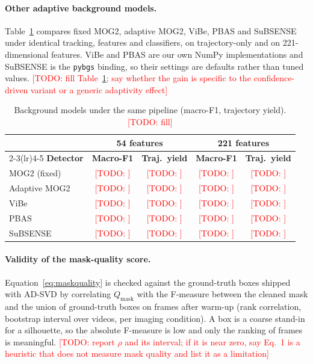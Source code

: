 \documentclass[runningheads]{llncs}
\newcommand{\todo}[1]{\textcolor{red}{[TODO: #1]}}
\begin{document}
\paragraph{Other adaptive background models.}
Table~\ref{tab:detectors} compares fixed MOG2, adaptive MOG2, ViBe, PBAS and SuBSENSE under identical tracking, features and classifiers, on trajectory-only and on 221-dimensional features. ViBe and PBAS are our own NumPy implementations and SuBSENSE is the \texttt{pybgs} binding, so their settings are defaults rather than tuned values. \todo{fill Table~\ref{tab:detectors}; say whether the gain is specific to the confidence-driven variant or a generic adaptivity effect}

\begin{table}[htbp]
\centering
\caption{Background models under the same pipeline (macro-F1, trajectory yield). \todo{fill}}
\label{tab:detectors}
\fontsize{8}{9.6}\selectfont
\begin{tabular}{lcccc}
\toprule
& \multicolumn{2}{c}{\textbf{54 features}} & \multicolumn{2}{c}{\textbf{221 features}} \\
\cmidrule(lr){2-3}\cmidrule(lr){4-5}
\textbf{Detector} & \textbf{Macro-F1} & \textbf{Traj.\ yield} & \textbf{Macro-F1} & \textbf{Traj.\ yield} \\
\midrule
MOG2 (fixed) & \todo{} & \todo{} & \todo{} & \todo{} \\
Adaptive MOG2 & \todo{} & \todo{} & \todo{} & \todo{} \\
ViBe & \todo{} & \todo{} & \todo{} & \todo{} \\
PBAS & \todo{} & \todo{} & \todo{} & \todo{} \\
SuBSENSE & \todo{} & \todo{} & \todo{} & \todo{} \\
\bottomrule
\end{tabular}
\end{table}

\paragraph{Validity of the mask-quality score.}
Equation~\ref{eq:maskquality} is checked against the ground-truth boxes shipped with AD-SVD by correlating $Q_{\text{mask}}$ with the F-measure between the cleaned mask and the union of ground-truth boxes on frames after warm-up (rank correlation, bootstrap interval over videos, per imaging condition). A box is a coarse stand-in for a silhouette, so the absolute F-measure is low and only the ranking of frames is meaningful. \todo{report $\rho$ and its interval; if it is near zero, say Eq.~1 is a heuristic that does not measure mask quality and list it as a limitation}
\end{document}
